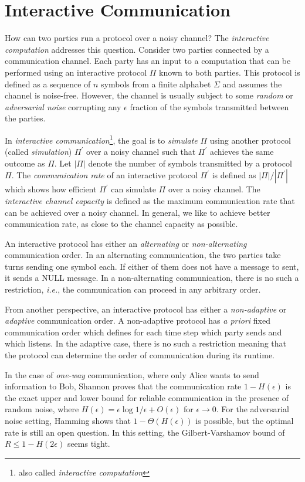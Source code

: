 \documentclass[10pt]{article}
\theoremstyle{plain}
\begin{document}
\section{Interactive Communication}

How can two parties run a protocol over a noisy channel? The \emph{interactive
	computation} addresses this question. Consider two parties connected
by a communication channel. Each party has an input to a computation
that can be performed using an interactive protocol $\Pi$ known to
both parties. This protocol is defined as a sequence of $n$ symbols
from a finite alphabet $\Sigma$ and assumes the channel is noise-free.
However, the channel is usually subject to some \emph{random} or \emph{adversarial
	noise} corrupting any $\epsilon$ fraction of the symbols transmitted
between the parties. 

In \emph{interactive communication}\footnote{also called \emph{interactive computation}},
the goal is to \emph{simulate} $\Pi$ using another protocol (called
\emph{simulation}) $\Pi^{\prime}$ over a noisy channel such that
$\Pi^{\prime}$ achieves the same outcome as $\Pi$. Let $|\Pi|$
denote the number of symbols transmitted by a protocol $\Pi$. The
\emph{communication rate} of an interactive protocol $\Pi^{\prime}$
is defined as $|\Pi|/|\Pi^{\prime}|$ which shows how efficient $\Pi^{\prime}$
can simulate $\Pi$ over a noisy channel. The \emph{interactive channel
	capacity} is defined as the maximum communication rate that can be
achieved over a noisy channel. In general, we like to achieve better
communication rate, as close to the channel capacity as possible. 

An interactive protocol has either an \emph{alternating }or \emph{non-alternating}
communication order. In an alternating communication, the two parties
take turns sending one symbol each. If either of them does not have
a message to sent, it sends a NULL message. In a non-alternating communication,
there is no such a restriction, \emph{i.e.}, the communication can
proceed in any arbitrary order. 

From another perspective, an interactive protocol has either a \emph{non-adaptive
}or \emph{adaptive} communication order. A non-adaptive protocol has
\emph{a priori} fixed communication order which defines for each time
step which party sends and which listens. In the adaptive case, there
is no such a restriction meaning that the protocol can determine the
order of communication during its runtime.

In the case of \emph{one-way }communication, where only Alice wants
to send information to Bob, Shannon proves that the communication
rate $1-H(\epsilon)$ is the exact upper and lower bound for reliable
communication in the presence of random noise, where $H(\epsilon)=\epsilon\log1/\epsilon+O(\epsilon)$
for $\epsilon\to0$. For the adversarial noise setting, Hamming shows
that $1-\Theta(H(\epsilon))$ is possible, but the optimal rate is
still an open question. In this setting, the Gilbert-Varshamov bound
of $R\leq1-H(2\epsilon)$ seems tight.
\end{document}
